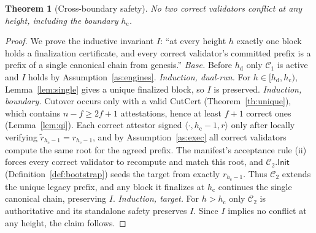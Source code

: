 \documentclass[journal]{IEEEtran}
\newtheorem{theorem}{Theorem}
\theoremstyle{remark}
\begin{document}
\begin{theorem}[Cross-boundary safety]
\label{th:safety}
No two correct validators conflict at any height, including the boundary $h_{\mathrm{c}}$.
\end{theorem}
\begin{proof}
We prove the inductive invariant $I$: ``at every height $h$ exactly one block holds a
finalization certificate, and every correct validator's committed prefix is a prefix of a
single canonical chain from genesis.'' \emph{Base.} Before $h_{\mathrm{d}}$ only $\mathcal{C}_1$
is active and $I$ holds by Assumption~\ref{as:engines}. \emph{Induction, dual-run.} For
$h\in[h_{\mathrm{d}},h_{\mathrm{c}})$, Lemma~\ref{lem:single} gives a unique finalized block, so
$I$ is preserved. \emph{Induction, boundary.} Cutover occurs only with a valid CutCert
(Theorem~\ref{th:unique}), which contains $n-f\ge 2f+1$ attestations, hence at least $f+1$
correct ones (Lemma~\ref{lem:qi}). Each correct attestor signed $\langle\cdot,h_{\mathrm{c}}-1,r\rangle$
only after locally verifying $\tilde r_{h_{\mathrm{c}}-1}=r_{h_{\mathrm{c}}-1}$, and by
Assumption~\ref{as:exec} all correct validators compute the same root for the agreed prefix.
The manifest's acceptance rule (ii) forces every correct validator to recompute and match this
root, and $\mathcal{C}_2.\mathsf{Init}$ (Definition~\ref{def:bootstrap}) seeds the target from
exactly $r_{h_{\mathrm{c}}-1}$. Thus $\mathcal{C}_2$ extends the unique legacy prefix, and any
block it finalizes at $h_{\mathrm{c}}$ continues the single canonical chain, preserving $I$.
\emph{Induction, target.} For $h>h_{\mathrm{c}}$ only $\mathcal{C}_2$ is authoritative and its
standalone safety preserves $I$. Since $I$ implies no conflict at any height, the claim
follows.
\end{proof}
\end{document}
